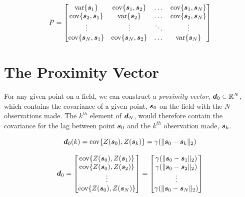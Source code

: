 \begin{equation}
    P = \begin{bmatrix} 

    \text{var}\{{\it{\boldsymbol{s}}}_1\} & \text{cov}\{{\it{\boldsymbol{s}}}_1, {\it{\boldsymbol{s}}}_2\} & \dots & \text{cov}\{{\it{\boldsymbol{s}}}_1, {\it{\boldsymbol{s}}}_N\} \\
    
    \text{cov}\{{\it{\boldsymbol{s}}}_2, {\it{\boldsymbol{s}}}_1\} & \text{var}\{{\it{\boldsymbol{s}}}_2\} & \dots & \text{cov}\{{\it{\boldsymbol{s}}}_2, {\it{\boldsymbol{s}}}_N\} \\

    \vdots & \vdots & \ddots & \vdots  \\
    
    \text{cov}\{{\it{\boldsymbol{s}}}_N, {\it{\boldsymbol{s}}}_1\} & \text{cov}\{{\it{\boldsymbol{s}}}_N, {\it{\boldsymbol{s}}}_2\} & \dots & \text{var}\{{\it{\boldsymbol{s}}}_N\} \\

    \end{bmatrix}
    \label{eq:covvarmat}
\end{equation}

\section{The Proximity Vector} \label{sec:proxvect}
For any given point on a field, we can construct a \textit{proximity vector}, ${\it{\boldsymbol{d}}}_0 \in \mathbb{R}^N$, which contains the covariance of a given point, ${\it{\boldsymbol{s}}}_0$ on the field with the $N$ observations made. The $k^{th}$ element of ${\it{\boldsymbol{d}}}_N$, would therefore contain the covariance for the lag between point ${\it{\boldsymbol{s}}}_0$ and the $k^{th}$ observation made, ${\it{\boldsymbol{s}}}_k$.

$${\it{\boldsymbol{d}}}_0(k) = \text{cov}\{Z({\it{\boldsymbol{s}}}_0), Z({\it{\boldsymbol{s}}}_k)\} = \gamma(\| {\it{\boldsymbol{s}}}_0 - {\it{\boldsymbol{s}}}_k \|_2)$$

\begin{equation}
    {\it{\boldsymbol{d}}}_0 = \begin{bmatrix} 
                    \text{cov}\{Z({\it{\boldsymbol{s}}}_0), Z({\it{\boldsymbol{s}}}_1)\} \\
                    \text{cov}\{Z({\it{\boldsymbol{s}}}_0), Z({\it{\boldsymbol{s}}}_2)\} \\
                     \vdots \\
                    \text{cov}\{Z({\it{\boldsymbol{s}}}_0), Z({\it{\boldsymbol{s}}}_N)\} \\
        \end{bmatrix} = 
        \begin{bmatrix} 
                    \gamma(\| {\it{\boldsymbol{s}}}_0 - {\it{\boldsymbol{s}}}_1 \|_2) \\
                    \gamma(\| {\it{\boldsymbol{s}}}_0 - {\it{\boldsymbol{s}}}_2 \|_2) \\
                     \vdots \\
                    \gamma(\| {\it{\boldsymbol{s}}}_0 - {\it{\boldsymbol{s}}}_N \|_2) \\
        \end{bmatrix} 
    \label{eq:proxvect}
\end{equation}

